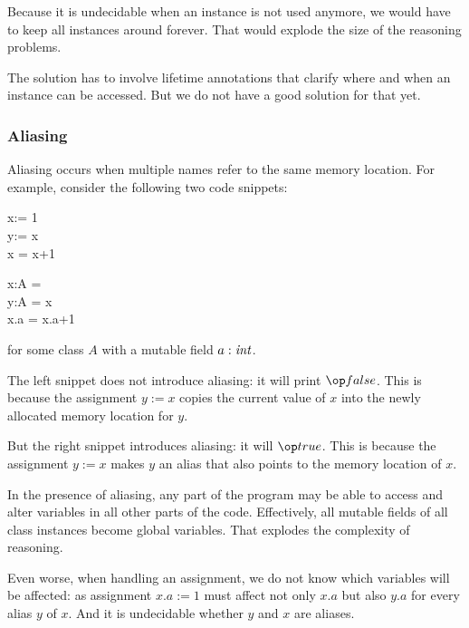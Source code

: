 Because it is undecidable when an instance is not used anymore, we would have to keep all instances around forever.
That would explode the size of the reasoning problems.

The solution has to involve lifetime annotations that clarify where and when an instance can be accessed.
But we do not have a good solution for that yet.

\subsubsection{Aliasing}

Aliasing occurs when multiple names refer to the same memory location.
For example, consider the following two code snippets:

\begin{multicols}{2}
\begin{acode}
x:\Int = 1\\
y:\Int = x\\
x = x+1\\
\end{acode}
\columnbreak

\begin{acode}
x:A = \\
y:A = x\\
x.a = x.a+1\\
\end{acode}
\end{multicols}
for some class $A$ with a mutable field $a:\mathit{int}$.

The left snippet does not introduce aliasing: it will print $\false$.
This is because the assignment $y:=x$ copies the current value of $x$ into the newly allocated memory location for $y$.

But the right snippet introduces aliasing: it will $\true$.
This is because the assignment $y:=x$ makes $y$ an alias that also points to the memory location of $x$.

In the presence of aliasing, any part of the program may be able to access and alter variables in all other parts of the code.
Effectively, all mutable fields of all class instances become global variables.
That explodes the complexity of reasoning.

Even worse, when handling an assignment, we do not know which variables will be affected: as assignment $x.a:=1$ must affect not only $x.a$ but also $y.a$ for every alias $y$ of $x$.
And it is undecidable whether $y$ and $x$ are aliases.

